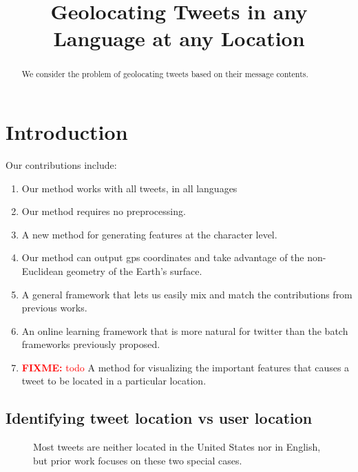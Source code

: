 \documentclass{article}
\title{Geolocating Tweets in any Language at any Location}
\author{\fixme{authors}}
\newcommand{\fixme}[1]{\textcolor{red}{\textbf{FIXME:} {#1}}}
\begin{document}
\maketitle

\begin{abstract}
    We consider the problem of geolocating tweets based on their message contents.
\end{abstract}

\section{Introduction}

Our contributions include:
\begin{enumerate}
    \item
        Our method works with all tweets, in all languages
    \item
        Our method requires no preprocessing.
    \item
        A new method for generating features at the character level.
    \item
        Our method can output gps coordinates and take advantage of the non-Euclidean geometry of the Earth's surface.
    \item
        A general framework that lets us easily mix and match the contributions from previous works.
    \item
        An online learning framework that is more natural for twitter than the batch frameworks previously proposed.
    \item
        \fixme{todo}
        A method for visualizing the important features that causes a tweet to be located in a particular location.
\end{enumerate}

\subsection{Identifying tweet location vs user location}

\begin{figure}
    
    
    \caption{Most tweets are neither located in the United States nor in English,
    but prior work focuses on these two special cases.}
\end{figure}

\end{document}
